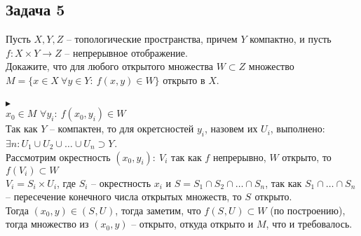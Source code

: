 		\subsection*{Задача 5}
		Пусть $X, Y, Z$ -- топологические пространства, причем $Y$ компактно, и пусть $f: X \times Y \to Z$ -- непрерывное отображение.\\
		Докажите, что для любого открытого множества $W \subset Z$ множество $M = \{x \in X\ \forall y \in Y:\ f(x,y) \in W\}$ открыто в $X$.\\
		\\
		$\blacktriangleright$\\
		$x_0 \in M$ $\forall y_i:\ f(x_0, y_i) \in W$\\
		Так как $Y$ -- компактен, то для окретсностей $y_i$, назовем их $U_i$, выполнено: $\exists n: U_1 \cup U_2 \cup \ldots \cup U_n \supset Y_{}$.\\
		Рассмотрим окрестность $(x_0, y_i):\ V_i$ так как $f$ непрерывно, $W$ открыто, то $f(V_i) \subset W$\\
		$V_i = S_i \times U_i$, где $S_i$ -- окрестность $x_i$ и $S = S_1 \cap S_2 \cap \ldots \cap S_n$, так как $S_1 \cap \ldots \cap S_n$ -- пересечение конечного числа открытых множеств, то $S_{}$ открыто.\\
		Тогда $(x_0, y) \in (S_{}, U_{})$, тогда заметим, что $f(S_{}, U_{}) \subset W$ (по построению), тогда множество из $(x_0, y)$ -- открыто, откуда открыто и $M$, что и требовалось.
